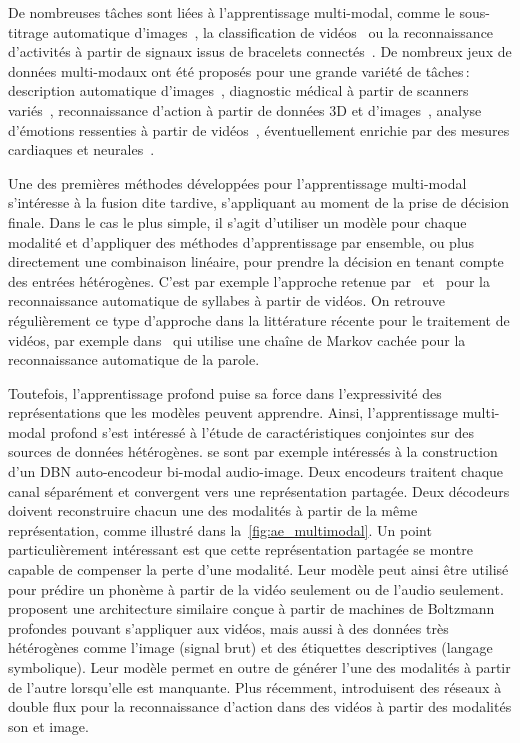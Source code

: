 De nombreuses tâches sont liées à l'apprentissage multi-modal, comme le sous-titrage automatique d'images~\cite{karpathy_deep_2015}, la classification de vidéos~\cite{kim_deep_2013} ou la reconnaissance d'activités à partir de signaux issus de bracelets connectés~\cite{ordonez_deep_2016}. De nombreux jeux de données multi-modaux ont été proposés pour une grande variété de tâches\,: description automatique d'images~\cite{hodosh_framing_2013}, diagnostic médical à partir de scanners variés~\cite{menze_multimodal_2015}, reconnaissance d'action à partir de données 3D et d'images~\cite{ofli_berkeley_2013}, analyse d'émotions ressenties à partir de vidéos~\cite{schuller_avec_2011}, éventuellement enrichie par des mesures cardiaques et neurales~\cite{ringeval_introducing_2013}.

Une des premières méthodes développées pour l'apprentissage multi-modal s'intéresse à la fusion dite tardive, s'appliquant au moment de la prise de décision finale. Dans le cas le plus simple, il s'agit d'utiliser un modèle pour chaque modalité et d'appliquer des méthodes d'apprentissage par ensemble, ou plus directement une combinaison linéaire, pour prendre la décision en tenant compte des entrées hétérogènes. C'est par exemple l'approche retenue par~\citet{yuhas_integration_1989} et~\citet{meier_adaptive_1996} pour la reconnaissance automatique de syllabes à partir de vidéos. On retrouve régulièrement ce type d'approche dans la littérature récente pour le traitement de vidéos, par exemple dans~\cite{noda_audio-visual_2015} qui utilise une chaîne de Markov cachée pour la reconnaissance automatique de la parole.

Toutefois, l'apprentissage profond puise sa force dans l'expressivité des représentations que les modèles peuvent apprendre. Ainsi, l'apprentissage multi-modal profond s'est intéressé à l'étude de caractéristiques conjointes sur des sources de données hétérogènes. \citet{ngiam_multimodal_2011} se sont par exemple intéressés à la construction d'un \gls{DBN} auto-encodeur bi-modal audio-image. Deux encodeurs traitent chaque canal séparément et convergent vers une représentation partagée. Deux décodeurs doivent reconstruire chacun une des modalités à partir de la même représentation, comme illustré dans la~\cref{fig:ae_multimodal}. Un point particulièrement intéressant est que cette représentation partagée se montre capable de compenser la perte d'une modalité. Leur modèle peut ainsi être utilisé pour prédire un phonème à partir de la vidéo seulement ou de l'audio seulement.
\citet{srivastava_multimodal_2014} proposent une architecture similaire conçue à partir de machines de Boltzmann profondes pouvant s'appliquer aux vidéos, mais aussi à des données très hétérogènes comme l'image (signal brut) et des étiquettes descriptives (langage symbolique). Leur modèle permet en outre de générer l'une des modalités à partir de l'autre lorsqu'elle est manquante. Plus récemment, \citet{simonyan_two-stream_2014} introduisent des réseaux à double flux pour la reconnaissance d'action dans des vidéos à partir des modalités son et image.

